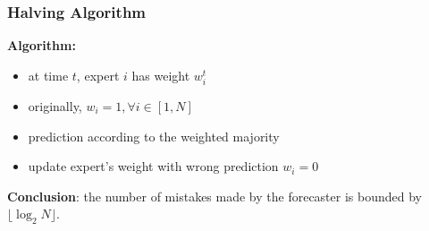 \documentclass{beamer}
\begin{document}
\begin{frame}
\frametitle{Halving Algorithm}
{\bf Algorithm:}
\begin{itemize}
\item at time $t$, expert $i$ has weight $w_i^t$
\pause
\item originally, $w_i = 1, \forall i\in[1,N]$
\pause
\item prediction according to the weighted majority 
\pause
\item update expert's weight with wrong prediction $w_i = 0$
\pause
\end{itemize}
{\bf Conclusion}: the number of mistakes made by the forecaster is bounded by {\color{red}$\lfloor\log_2 N\rfloor$}.
\end{frame}

\end{document}

